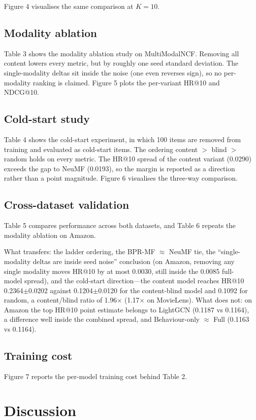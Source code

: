 \documentclass[11pt,a4paper]{article}
\begin{document}
Figure 4 visualises the same comparison at $K{=}10$.

\subsection{Modality ablation}
Table 3 shows the modality ablation study on MultiModalNCF. Removing all content
lowers every metric, but by roughly one seed standard deviation. The
single-modality deltas sit inside the noise (one even reverses sign), so no
per-modality ranking is claimed. Figure 5 plots the per-variant HR@10 and
NDCG@10.

\subsection{Cold-start study}
Table 4 shows the cold-start experiment, in which 100 items are removed from
training and evaluated as cold-start items. The ordering content $>$ blind $>$
random holds on every metric. The HR@10 spread of the content variant (0.0290)
exceeds the gap to NeuMF (0.0193), so the margin is reported as a direction
rather than a point magnitude. Figure 6 visualises the three-way comparison.

\subsection{Cross-dataset validation}
Table 5 compares performance across both datasets, and Table 6 repeats the
modality ablation on Amazon.

What transfers: the ladder ordering, the BPR-MF $\approx$ NeuMF tie, the
``single-modality deltas are inside seed noise'' conclusion (on Amazon, removing
any single modality moves HR@10 by at most 0.0030, still inside the 0.0085
full-model spread), and the cold-start direction---the content model reaches
HR@10 0.2364$\pm$0.0202 against 0.1204$\pm$0.0120 for the content-blind model and
0.1092 for random, a content/blind ratio of 1.96$\times$ (1.17$\times$ on
MovieLens). What does not: on Amazon the top HR@10 point estimate belongs to
LightGCN (0.1187 vs 0.1164), a difference well inside the combined spread, and
Behaviour-only $\approx$ Full (0.1163 vs 0.1164).

\subsection{Training cost}
Figure 7 reports the per-model training cost behind Table 2.

\section{Discussion}
\end{document}
